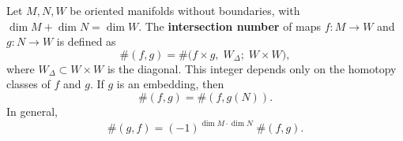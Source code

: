 Let $M, N, W$ be oriented manifolds without boundaries, with $\dim M + \dim N = \dim W$. The \textbf{intersection number} of maps $f \colon M \to W$ and $g \colon N \to W$ is defined as
$$
\#(f, g) = \#\bigl(f \times g,\; W_{\!\Delta};\; W \times W\bigr),
$$
where $W_{\!\Delta} \subset W \times W$ is the diagonal. This integer depends only on the homotopy classes of $f$ and $g$. If $g$ is an embedding, then
$$
\#(f, g) = \#(f, g(N)).
$$
In general,
$$
\#(g, f) = (-1)^{\dim M \cdot \dim N} \; \#(f, g).
$$
